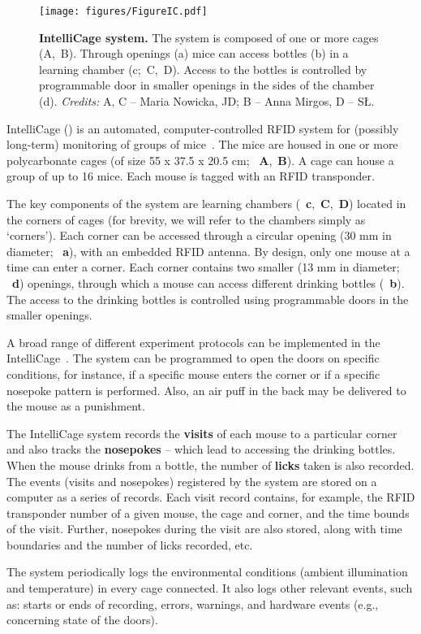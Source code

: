 
\begin{figure*}
  \texttt{[image: figures/FigureIC.pdf]}
  \caption{
    {\bf IntelliCage system.} 
    The system is composed of one or more cages (A,~B).
    Through openings (a) mice can access bottles (b) in a learning chamber (c;~C,~D).
    Access to the bottles is controlled by programmable door in smaller openings in the sides
    of the chamber (d). \emph{Credits:} A, C -- Maria Nowicka, JD; B -- Anna Mirgos, D -- SŁ.
  }
  \label{intellicageSystem}
\end{figure*}

IntelliCage () is an automated, computer-controlled RFID system for
(possibly long-term) monitoring of groups of
mice~\cite{Galsworthy:2005br,Krackow:2010ck,Puscian:2014cu}. The mice are housed in 
one or more polycarbonate cages (of size 55 x 37.5 x 20.5 cm;
~\textbf{A},~\textbf{B}). A cage can house a group of up to
16 mice. Each mouse is tagged with an RFID transponder.

The key components of the system are learning chambers
(~\textbf{c},~\textbf{C},~\textbf{D}) 
located in the corners of cages
(for brevity, we will refer to the chambers simply as `corners'). Each
corner can be accessed through a circular opening (30 mm in diameter; ~\textbf{a}),
with an embedded RFID antenna. By design, only one mouse at a time can enter
a corner. Each corner contains two smaller (13 mm in diameter; ~\textbf{d}) openings,
through which a mouse can access different drinking bottles (~\textbf{b}). The access to the
drinking bottles is controlled using programmable doors in
the smaller openings.


A broad range of different experiment protocols can be implemented in the
IntelliCage~\cite{Knapska:2006cz,Kiryk:2011tk,Endo:2011bs,Radwanska:2012fd,Knapska:2013dj,Smutek:2014da,Puscian:2014cu,Vannoni:2014jt}.
The system can be programmed to open the doors on specific conditions, for
instance, if a specific mouse enters the corner or if a specific nosepoke
pattern is performed. Also, an air puff in the back may be delivered to the
mouse as a punishment.

The IntelliCage system records the \textbf{visits} of
each mouse to a particular corner and also tracks the \textbf{nosepokes}
-- which lead to accessing the drinking bottles. When the mouse drinks
from a bottle, the number of \textbf{licks} taken is also recorded.
The events (visits and nosepokes) registered by the system are stored on a
computer as a series of records. Each visit record contains, for example,
the RFID transponder number of a given mouse, the cage and corner,
and the time bounds of the visit. Further,
nosepokes during the visit are also stored, along with
time boundaries and the number of licks recorded, etc.

The system periodically logs the environmental conditions (ambient
illumination and temperature) in every cage connected. It also logs other
relevant events, such as: starts or ends of recording, errors, warnings, and
hardware events (e.g., concerning state of the doors).
